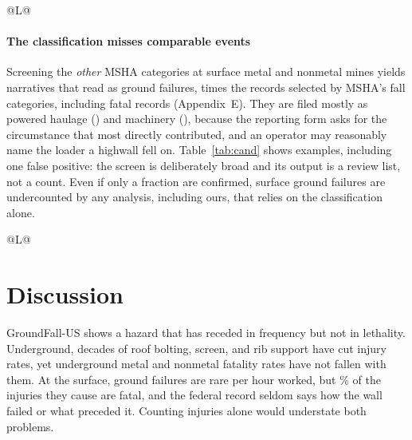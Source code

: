 \documentclass[letterpaper,twocolumn,10pt]{article}
\begin{document}
\begin{table}[t]
\small
\begin{tabularx}{\columnwidth}{@{}L@{}}
\toprule
{}
\bottomrule
\end{tabularx}
\caption{Labelling and selection errors found by inspection (rules version \RulesVersion).}
\label{tab:errors}
\end{table}

\paragraph{The classification misses comparable events} Screening the \emph{other} MSHA categories at surface metal and nonmetal mines yields \NCand{} narratives that read as ground failures, \CandRatio{} times the \NCoded{} records selected by MSHA's fall categories, including \NCandFatal{} fatal records (Appendix~E). They are filed mostly as powered haulage (\NCandPH) and machinery (\NCandMach), because the reporting form asks for the circumstance that most directly contributed, and an operator may reasonably name the loader a highwall fell on. Table~\ref{tab:cand} shows examples, including one false positive: the screen is deliberately broad and its output is a review list, not a count. Even if only a fraction are confirmed, surface ground failures are undercounted by any analysis, including ours, that relies on the classification alone.

\begin{table}[t]
\small
\begin{tabularx}{\columnwidth}{@{}L@{}}
\toprule
{}
\bottomrule
\end{tabularx}
\caption{Candidate ground failures filed outside MSHA's fall categories at surface metal and nonmetal mines.}
\label{tab:cand}
\end{table}

\section{Discussion}
GroundFall-US shows a hazard that has receded in frequency but not in lethality. Underground, decades of roof bolting, screen, and rib support have cut injury rates, yet underground metal and nonmetal fatality rates have not fallen with them. At the surface, ground failures are rare per hour worked, but \CFRSurf\% of the injuries they cause are fatal, and the federal record seldom says how the wall failed or what preceded it. Counting injuries alone would understate both problems.
\end{document}

